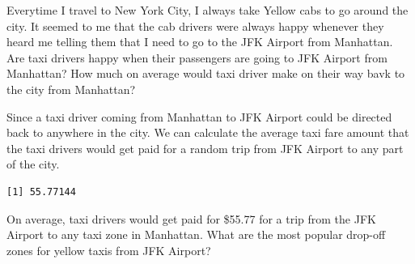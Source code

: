 \documentclass[12pt,twoside]{reedthesis}
\newenvironment{Shaded}{\begin{snugshade}}{\end{snugshade}}
\newcommand{\KeywordTok}[1]{\textcolor[rgb]{0.13,0.29,0.53}{\textbf{#1}}}
\newcommand{\DataTypeTok}[1]{\textcolor[rgb]{0.13,0.29,0.53}{#1}}
\newcommand{\DecValTok}[1]{\textcolor[rgb]{0.00,0.00,0.81}{#1}}
\newcommand{\FloatTok}[1]{\textcolor[rgb]{0.00,0.00,0.81}{#1}}
\newcommand{\StringTok}[1]{\textcolor[rgb]{0.31,0.60,0.02}{#1}}
\newcommand{\OperatorTok}[1]{\textcolor[rgb]{0.81,0.36,0.00}{\textbf{#1}}}
\newcommand{\NormalTok}[1]{#1}
\theoremstyle{definition}
\theoremstyle{definition}
\theoremstyle{definition}
\theoremstyle{remark}
\begin{document}
Everytime I travel to New York City, I always take Yellow cabs to go
around the city. It seemed to me that the cab drivers were always happy
whenever they heard me telling them that I need to go to the JFK Airport
from Manhattan. Are taxi drivers happy when their passengers are going
to JFK Airport from Manhattan? How much on average would taxi driver
make on their way bavk to the city from Manhattan?
\begin{Shaded}
\end{Shaded}
Since a taxi driver coming from Manhattan to JFK Airport could be
directed back to anywhere in the city. We can calculate the average taxi
fare amount that the taxi drivers would get paid for a random trip from
JFK Airport to any part of the city.
\begin{Shaded}
\end{Shaded}
\begin{verbatim}
[1] 55.77144
\end{verbatim}
On average, taxi drivers would get paid for \$55.77 for a trip from the
JFK Airport to any taxi zone in Manhattan. What are the most popular
drop-off zones for yellow taxis from JFK Airport?
\end{document}
